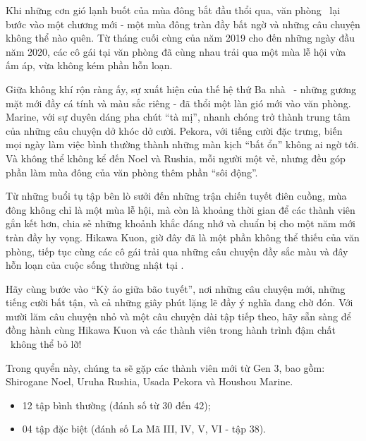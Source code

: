 \documentclass[main.tex]{subfiles}
\begin{document}
Khi những cơn gió lạnh buốt của mùa đông bắt đầu thổi qua, văn phòng \hll\ lại bước vào một chương mới - một mùa đông tràn đầy bất ngờ và những câu chuyện không thể nào quên. Từ tháng cuối cùng của năm 2019 cho đến những ngày đầu năm 2020, các cô gái tại văn phòng đã cùng nhau trải qua một mùa lễ hội vừa ấm áp, vừa không kém phần hỗn loạn.

Giữa không khí rộn ràng ấy, sự xuất hiện của thế hệ thứ Ba nhà \hll\ - những gương mặt mới đầy cá tính và màu sắc riêng - đã thổi một làn gió mới vào văn phòng. Marine, với sự duyên dáng pha chút ``tà mị'', nhanh chóng trở thành trung tâm của những câu chuyện dở khóc dở cười. Pekora, với tiếng cười đặc trưng, biến mọi ngày làm việc bình thường thành những màn kịch ``bất ổn'' không ai ngờ tới. Và không thể không kể đến Noel và Rushia, mỗi người một vẻ, nhưng đều góp phần làm mùa đông của văn phòng thêm phần ``sôi động''.

Từ những buổi tụ tập bên lò sưởi đến những trận chiến tuyết điên cuồng, mùa đông không chỉ là một mùa lễ hội, mà còn là khoảng thời gian để các thành viên gắn kết hơn, chia sẻ những khoảnh khắc đáng nhớ và chuẩn bị cho một năm mới tràn đầy hy vọng. Hikawa Kuon, giờ đây đã là một phần không thể thiếu của văn phòng, tiếp tục cùng các cô gái trải qua những câu chuyện đầy sắc màu và đây hỗn loạn của cuộc sống thường nhật tại \hll.

Hãy cùng bước vào ``Kỳ ảo giữa bão tuyết'', nơi những câu chuyện mới, những tiếng cười bất tận, và cả những giây phút lặng lẽ đầy ý nghĩa đang chờ đón. Với mười lăm câu chuyện nhỏ và một câu chuyện dài tập tiếp theo, hãy sẵn sàng để đồng hành cùng Hikawa Kuon và các thành viên trong hành trình đậm chất \hll\ không thể bỏ lỡ!

Trong quyển này, chúng ta sẽ gặp các thành viên mới từ Gen 3, bao gồm: Shirogane Noel, Uruha Rushia, Usada Pekora và Houshou Marine.

{}
\begin{itemize}
    \item 12 tập bình thường (đánh số từ 30 đến 42);
    \item 04 tập đặc biệt (đánh số La Mã III, IV, V, VI - tập 38).
\end{itemize}
\end{document}
